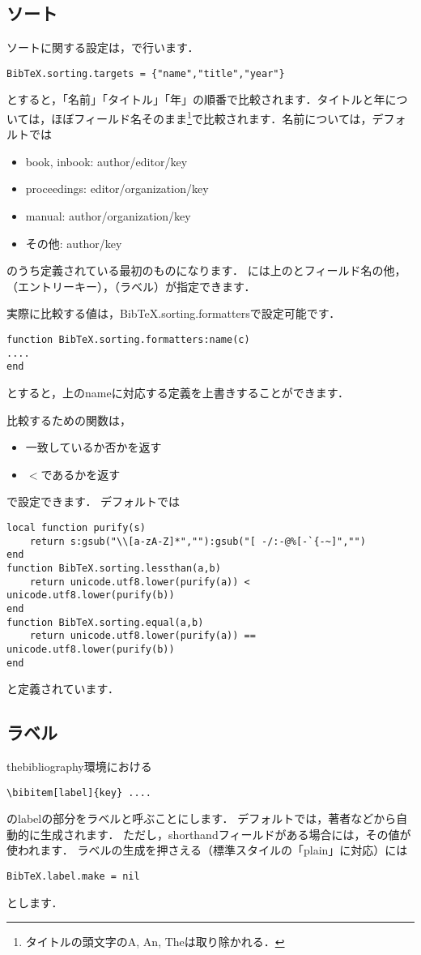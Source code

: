 \documentclass[a4paper]{ltjsarticle}
\begin{document}
\subsection{ソート}
ソートに関する設定は，で行います．
\begin{lstlisting}
BibTeX.sorting.targets = {"name","title","year"}
\end{lstlisting}
とすると，「名前」「タイトル」「年」の順番で比較されます．タイトルと年については，ほぼフィールド名そのまま\footnote{タイトルの頭文字のA, An, Theは取り除かれる．}で比較されます．名前については，デフォルトでは
\begin{itemize}
\item book, inbook: author/editor/key
\item proceedings: editor/organization/key
\item manual: author/organization/key
\item その他: author/key
\end{itemize}
のうち定義されている最初のものになります．
には上のとフィールド名の他，（エントリーキー），（ラベル）が指定できます．

実際に比較する値は，BibTeX.sorting.formattersで設定可能です．
\begin{lstlisting}
function BibTeX.sorting.formatters:name(c)
....
end
\end{lstlisting}
とすると，上のnameに対応する定義を上書きすることができます．

比較するための関数は，
\begin{itemize}
\item 一致しているか否かを返す
\item $<$であるかを返す
\end{itemize}
で設定できます．
デフォルトでは
\begin{lstlisting}
local function purify(s)
    return s:gsub("\\[a-zA-Z]*",""):gsub("[ -/:-@%[-`{-~]","")
end
function BibTeX.sorting.lessthan(a,b)
    return unicode.utf8.lower(purify(a)) < unicode.utf8.lower(purify(b))
end
function BibTeX.sorting.equal(a,b)
    return unicode.utf8.lower(purify(a)) == unicode.utf8.lower(purify(b))
end
\end{lstlisting}
と定義されています．

\subsection{ラベル}
thebibliography環境における
\begin{lstlisting}[language={[latex]TeX}]
\bibitem[label]{key} ....
\end{lstlisting}
のlabelの部分をラベルと呼ぶことにします．
デフォルトでは，著者などから自動的に生成されます．
ただし，shorthandフィールドがある場合には，その値が使われます．
ラベルの生成を押さえる（標準スタイルの「plain」に対応）には
\begin{lstlisting}
BibTeX.label.make = nil
\end{lstlisting}
とします．
\end{document}
